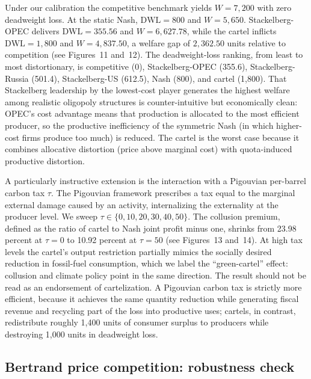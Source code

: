 Under our calibration the competitive benchmark yields $W = 7{,}200$
with zero deadweight loss. At the static Nash, $\mathrm{DWL} = 800$ and
$W = 5{,}650$. Stackelberg-OPEC delivers $\mathrm{DWL} = 355.56$ and
$W = 6{,}627.78$, while the cartel inflicts $\mathrm{DWL} = 1{,}800$ and
$W = 4{,}837.50$, a welfare gap of $2{,}362.50$ units relative to
competition (see Figures~11 and~12). The deadweight-loss ranking, from
least to most distortionary, is competitive (0), Stackelberg-OPEC
(355.6), Stackelberg-Russia (501.4), Stackelberg-US (612.5), Nash
(800), and cartel (1,800). That Stackelberg leadership by the
lowest-cost player generates the highest welfare among realistic
oligopoly structures is counter-intuitive but economically clean: OPEC's
cost advantage means that production is allocated to the most efficient
producer, so the productive inefficiency of the symmetric Nash (in which
higher-cost firms produce too much) is reduced. The cartel is the worst
case because it combines allocative distortion (price above marginal
cost) with quota-induced productive distortion.

A particularly instructive extension is the interaction with a Pigouvian
per-barrel carbon tax $\tau$. The Pigouvian framework
\citep[p.~??]{pigou1920} prescribes a tax equal to the marginal external damage
caused by an activity, internalizing the externality at the producer
level. We sweep $\tau \in \{0, 10, 20, 30, 40, 50\}$. The collusion
premium, defined as the ratio of cartel to Nash joint profit minus one,
shrinks from 23.98 percent at $\tau = 0$ to 10.92 percent at $\tau = 50$
(see Figures~13 and~14). At high tax levels the cartel's output
restriction partially mimics the socially desired reduction in
fossil-fuel consumption, which we label the ``green-cartel'' effect:
collusion and climate policy point in the same direction. The result
should not be read as an endorsement of cartelization. A Pigouvian
carbon tax is strictly more efficient, because it achieves the same
quantity reduction while generating fiscal revenue and recycling part of
the loss into productive uses; cartels, in contrast, redistribute
roughly 1,400 units of consumer surplus to producers while destroying
1,000 units in deadweight loss.

\subsection{Bertrand price competition: robustness check}
\label{subsec:bertrand}

